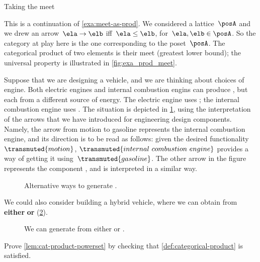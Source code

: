 \begin{marginfigure}
	\centering
	\caption{Taking the meet}
	\label{fig:exa_prod_meet_cont}
\end{marginfigure}

\begin{example}
	\label{exa:meet-as-prod-cont}
	This is a continuation of \cref{exa:meet-as-prod}.
	We considered a lattice~$\posA$ and we drew an arrow~$\ela \to \elb$ iff~$\ela \leq \elb$, for~$\ela,\elb\in \posA$.
	So the category at play here is the one corresponding to the poset~$\posA$.
	The categorical product of two elements is their meet (greatest lower bound); the universal property is illustrated in \cref{fig:exa_prod_meet}.
\end{example}

\begin{example}
	Suppose that we are designing a vehicle, and we are thinking about choices of engine.
	Both electric engines and internal combustion engins can produce , but each from a different source of energy.
	The electric engine uses ; the internal combustion engine uses .
	The situation is depicted in \cref{fig:e14}, using the interpretation of the arrows that we have introduced for engineering design components.
	Namely, the arrow from motion to gasoline represents the internal combustion engine, and its direction is to be read as follows: given the desired functionality~$\transmuted{motion}$, $\transmuted{internal \ combustion \ engine}$ provides a way of getting it using~$\transmuted{gasoline}$.
	The other arrow in the figure represents the component , and is interpreted in a similar way.

	\begin{figure}[h!]
		\centering
		\caption{Alternative ways to generate . }
		\label{fig:e14}
	\end{figure}

	We could also consider building a hybrid vehicle, where we can obtain  from \textbf{either}  \textbf{or}  (\cref{fig:e15}).

	\begin{figure}[h!]
		\centering
		\caption{We can generate  from either  or  .}
		\label{fig:e15}
	\end{figure}
\end{example}

\vfill
\begin{gradedexercise}
	\label{ex:CatProductPowerset}
	Prove \cref{lem:cat-product-powerset} by checking that \cref{def:categorical-product} is satisfied.
\end{gradedexercise}

